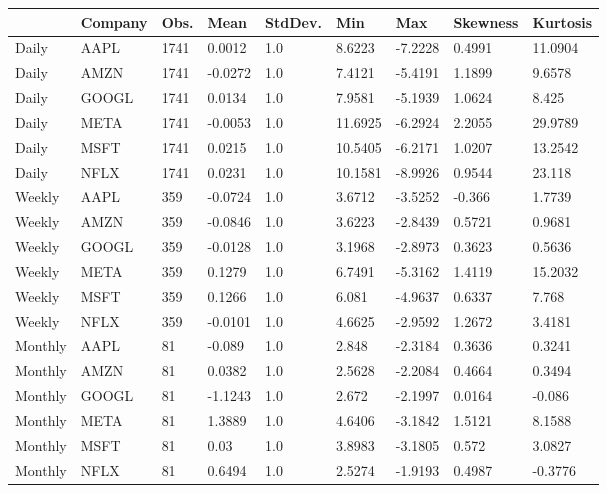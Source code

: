 \begin{tabular}{lllllllll}
\toprule
{} & Company &  Obs. &    Mean & StdDev. &      Min &     Max & Skewness & Kurtosis \\
\midrule
Daily   &    AAPL &  1741 &  0.0012 &     1.0 &   8.6223 & -7.2228 &   0.4991 &  11.0904 \\
Daily   &    AMZN &  1741 & -0.0272 &     1.0 &   7.4121 & -5.4191 &   1.1899 &   9.6578 \\
Daily   &   GOOGL &  1741 &  0.0134 &     1.0 &   7.9581 & -5.1939 &   1.0624 &    8.425 \\
Daily   &    META &  1741 & -0.0053 &     1.0 &  11.6925 & -6.2924 &   2.2055 &  29.9789 \\
Daily   &    MSFT &  1741 &  0.0215 &     1.0 &  10.5405 & -6.2171 &   1.0207 &  13.2542 \\
Daily   &    NFLX &  1741 &  0.0231 &     1.0 &  10.1581 & -8.9926 &   0.9544 &   23.118 \\
Weekly  &    AAPL &   359 & -0.0724 &     1.0 &   3.6712 & -3.5252 &   -0.366 &   1.7739 \\
Weekly  &    AMZN &   359 & -0.0846 &     1.0 &   3.6223 & -2.8439 &   0.5721 &   0.9681 \\
Weekly  &   GOOGL &   359 & -0.0128 &     1.0 &   3.1968 & -2.8973 &   0.3623 &   0.5636 \\
Weekly  &    META &   359 &  0.1279 &     1.0 &   6.7491 & -5.3162 &   1.4119 &  15.2032 \\
Weekly  &    MSFT &   359 &  0.1266 &     1.0 &    6.081 & -4.9637 &   0.6337 &    7.768 \\
Weekly  &    NFLX &   359 & -0.0101 &     1.0 &   4.6625 & -2.9592 &   1.2672 &   3.4181 \\
Monthly &    AAPL &    81 &  -0.089 &     1.0 &    2.848 & -2.3184 &   0.3636 &   0.3241 \\
Monthly &    AMZN &    81 &  0.0382 &     1.0 &   2.5628 & -2.2084 &   0.4664 &   0.3494 \\
Monthly &   GOOGL &    81 & -1.1243 &     1.0 &    2.672 & -2.1997 &   0.0164 &   -0.086 \\
Monthly &    META &    81 &  1.3889 &     1.0 &   4.6406 & -3.1842 &   1.5121 &   8.1588 \\
Monthly &    MSFT &    81 &    0.03 &     1.0 &   3.8983 & -3.1805 &    0.572 &   3.0827 \\
Monthly &    NFLX &    81 &  0.6494 &     1.0 &   2.5274 & -1.9193 &   0.4987 &  -0.3776 \\
\bottomrule
\end{tabular}
